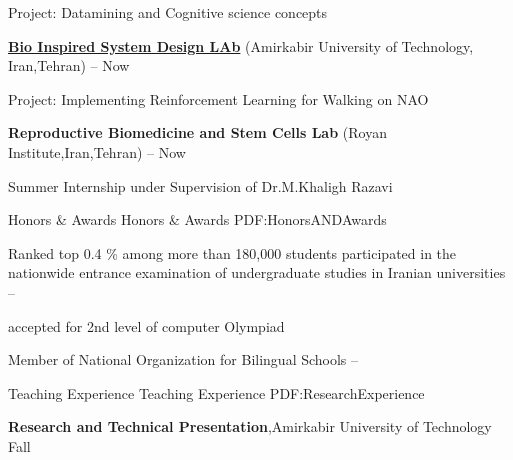 \documentclass[letterpaper,MMMyyyy,nonstopmode]{simpleresumecv}
\begin{document}
\begin{Body}
\begin{Detail}
\SubBulletItem
Project: Datamining and Cognitive science concepts

\end{Detail}
\href{}
{\textbf{Bio Inspired System Design LAb}} 
\newline (Amirkabir University of Technology,
Iran,Tehran)
\hfill
{} --
Now

\begin{Detail}
\SubBulletItem
Project: Implementing Reinforcement Learning for Walking on NAO
\end{Detail}

{\textbf{Reproductive Biomedicine and Stem Cells Lab}} 
\newline (Royan Institute,Iran,Tehran)
\hfill
{} --
Now
\begin{Detail}
\SubBulletItem
Summer Internship under Supervision of Dr.M.Khaligh Razavi
\end{Detail}






\Gap




\Section
{Honors \&\newline
Awards}
{Honors \& Awards}
{PDF:HonorsANDAwards}

\BulletItem
Ranked top 0.4 \% among more than 180,000 students participated
in the nationwide entrance examination of undergraduate studies
in Iranian universities  
\hfill
{} --

\BulletItem
 accepted for 2nd level of computer Olympiad 
\hfill
{}


\BulletItem
 Member of National Organization for Bilingual Schools
\hfill
{} --





\Section
{Teaching Experience}
{Teaching Experience}
{PDF:ResearchExperience}

\Entry
\textbf{Research and Technical Presentation},Amirkabir University of Technology
\hfill
Fall 



\end{Body}
\end{document}
